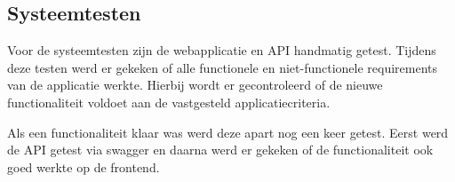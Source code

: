 \subsection{Systeemtesten}
Voor de systeemtesten zijn de webapplicatie en API handmatig getest.
Tijdens deze testen werd er gekeken of alle functionele en niet-functionele requirements van de applicatie werkte.
Hierbij wordt er gecontroleerd of de nieuwe functionaliteit voldoet aan de vastgesteld applicatiecriteria.

\whitespace
Als een functionaliteit klaar was werd deze apart nog een keer getest.
Eerst werd de API getest via swagger en daarna werd er gekeken of de functionaliteit ook goed werkte op de frontend.
